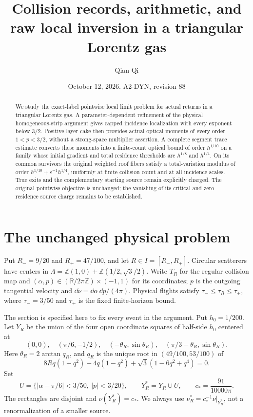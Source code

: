 \documentclass[11pt,reqno]{amsart}
\title[Collision records and raw local inversion]{Collision records, arithmetic, and raw local inversion in a triangular Lorentz gas}
\author{Qian Qi}
\date{October 12, 2026. A2-DYN, revision 88}
\numberwithin{equation}{section}
\theoremstyle{definition}
\theoremstyle{remark}\newtheorem{remark}[theorem]{Remark}
\newcommand{\R}{\mathbb R}\newcommand{\Z}{\mathbb Z}
\begin{document}
\raggedbottom
\begin{abstract}
We study the exact-label pointwise local limit problem for actual
returns in a triangular Lorentz gas. A parameter-dependent refinement
of the physical homogeneous-strip argument gives capped incidence
localization with every exponent below $3/2$. Positive layer cake then
provides actual optical moments of every order $1<p<3/2$, without a
strong-space multiplier assertion. A complete segment trace estimate
converts these moments into a finite-count optical bound of order
$h^{1/10}$ on a family whose initial gradient and total residence
thresholds are $h^{1/8}$ and $h^{1/4}$. On its common survivors the
original weighted roof fibers satisfy a total-variation modulus of
order $h^{1/10}+\varepsilon^{-1}h^{1/4}$, uniformly at finite collision
count and at all incidence scales. True exits and the complementary
starting source remain explicitly charged. The original pointwise
objective is unchanged; the vanishing of its critical and zero-residence
source charge remains to be established.
\end{abstract}
\maketitle

\section{The unchanged physical problem}
Put $R_-=9/20$ and $R_+=47/100$, and let $R\in I=[R_-,R_+]$. Circular scatterers have centers in
$\Lambda=\Z(1,0)+\Z(1/2,\sqrt3/2)$. Write $T_R$ for the regular
collision map and $(\alpha,p)\in(\R/2\pi\Z)\times(-1,1)$ for its
coordinates; $p$ is the outgoing tangential velocity and
$\dd\nu=\dd\alpha\,\dd p/(4\pi)$. Physical flights satisfy
$\tau_-\le\tau_R\le\tau_+$, where $\tau_-=3/50$ and $\tau_+$
is the fixed finite-horizon bound.

The section is specified here to fix every event in the argument.
Put $h_0=1/200$. Let $Y_R$ be the union of the four open coordinate
squares of half-side $h_0$ centered at
\[
 (0,0),\quad(\pi/6,-1/2),\quad
 (-\theta_R,\sin\theta_R),\quad
 (\pi/3-\theta_R,\sin\theta_R).
\]
Here $\theta_R=2\arctan q_R$, and $q_R$ is the unique root in
$(49/100,53/100)$ of
\[
 8Rq(1+q^2)-4q(1-q^2)+\sqrt3(1-6q^2+q^4)=0.
\]
Set
\[
 U=\{|\alpha-\pi/6|<3/50,\ |p|<3/20\},\qquad
 Y_R^*=Y_R\cup U,\qquad c_*=\frac{91}{10000\pi}.
\]
The rectangles are disjoint and $\nu(Y_R^*)=c_*$. We always use
$\nu_R^*=c_*^{-1}\nu|_{Y_R^*}$, not a renormalization of a smaller
source.
\end{document}
